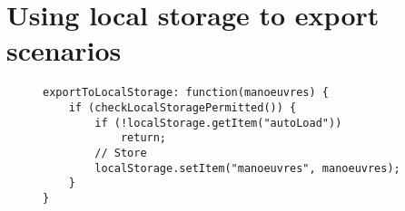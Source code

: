 \section{Using local storage to export scenarios}
\label{code:localStorage}
\begin{figure}[h!]
\caption{}
\begin{lstlisting}
exportToLocalStorage: function(manoeuvres) {
    if (checkLocalStoragePermitted()) {
        if (!localStorage.getItem("autoLoad"))
            return;
        // Store
        localStorage.setItem("manoeuvres", manoeuvres);
    }
}
\end{lstlisting}
\end{figure}